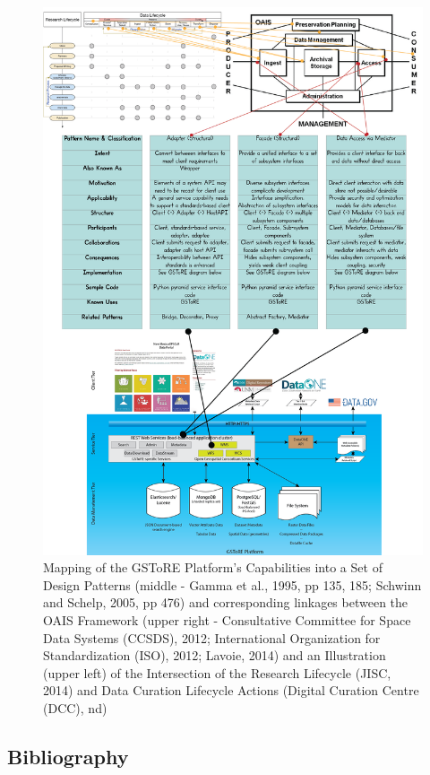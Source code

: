 \documentclass[final]{beamer}
\begin{document}
\begin{frame}[t]
\begin{multicols}{2}
\begin{figure}[htbp]
\centering
\includegraphics[width=8.00000in]{Composite-DesignPatternMapping.png}
\caption{Mapping of the GSToRE Platform's Capabilities into a Set of
Design Patterns (middle - Gamma et al., 1995, pp 135, 185; Schwinn and
Schelp, 2005, pp 476) and corresponding linkages between the OAIS
Framework (upper right - Consultative Committee for Space Data Systems
(CCSDS), 2012; International Organization for Standardization (ISO),
2012; Lavoie, 2014) and an Illustration (upper left) of the Intersection
of the Research Lifecycle (JISC, 2014) and Data Curation Lifecycle
Actions (Digital Curation Centre (DCC), nd)}
\end{figure}

\subsection{Bibliography}\label{bibliography}


\end{multicols}
\end{frame}
\end{document}

